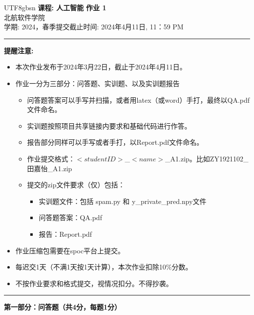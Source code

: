 \documentclass[a4paper, 11pt]{article}
\newenvironment{problem}[2][Q]
    { \begin{mdframed}[backgroundcolor=gray!20] \textbf{#1 #2} \\}
    {  \end{mdframed}}
\begin{document}
\begin{CJK}{UTF8}{gbsn}
\noindent
\large\textbf{课程: 人工智能} \hfill \textbf{作业 1}   \\
北航软件学院 \\
\normalsize 学期: 2024，春季\hfill 提交截止时间:  2024年4月11日, 11：59 PM \\
\noindent\rule{7in}{2.8pt}
\textbf{提醒注意:}
\begin{itemize}
\item 本次作业发布于2024年3月22日，截止于2024年4月11日。
\item 作业一分为三部分：问答题、实训题、以及实训题报告
\begin{itemize}
    \item 问答题答案可以手写并扫描，或者用latex（或word）手打，最终以QA.pdf文件命名。
    \item 实训题按照项目共享链接内要求和基础代码进行作答。
    \item 报告部分同样可以手写或者手打，以Report.pdf文件命名。
    \item 作业提交格式：$<student ID>$\_$<name>$\_A1.zip。比如ZY1921102\_田嘉怡\_A1.zip
    \item 提交的zip文件要求（仅）包括：
    \begin{itemize}
        \item 实训题文件：包括 spam.py 和 y\_private\_pred.npy文件
        \item 问答题答案：QA.pdf
        \item 报告：Report.pdf
    \end{itemize}
    
\end{itemize}
\item 作业压缩包需要在spoc平台上提交。
\item 每迟交1天（不满1天按1天计算），本次作业扣除10\%分数。
\item 不按作业要求和格式提交，视情况扣分。不得抄袭。
\end{itemize}

\noindent\rule{7in}{1pt}
\textbf{第一部分：问答题（共4分，每题1分）}


\end{CJK}
\end{document}
